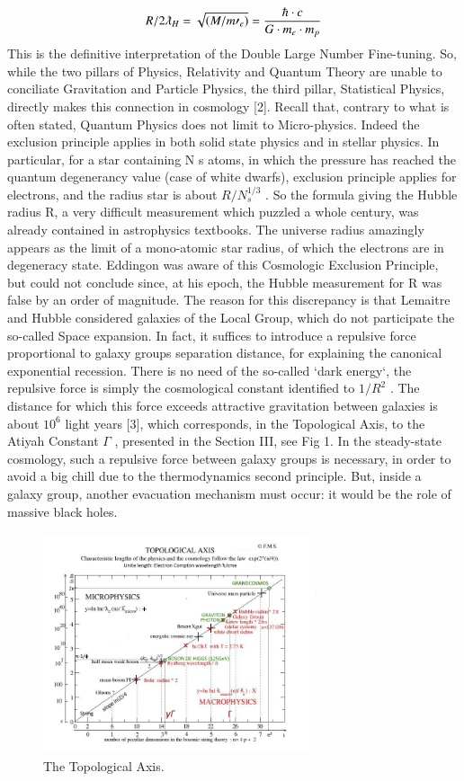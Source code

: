 \documentclass[twoside,draft]{article}
\begin{document}
{$$R/2\lambdabar_{H} = \sqrt{(M/m\prime_{e})} = \frac{\hbar \cdot c}{G \cdot m_{e}\cdot m_{p}}$$
This is the definitive interpretation of the Double Large Number Fine-tuning. So, while the two
pillars of Physics, Relativity and Quantum Theory are unable to conciliate Gravitation and Particle
Physics, the third pillar, Statistical Physics, directly makes this connection in cosmology [2].
Recall that, contrary to what is often stated, Quantum Physics does not limit to Micro-physics.
Indeed the exclusion principle applies in both solid state physics and in stellar physics. In particular,
for a star containing N s atoms, in which the pressure has reached the quantum degenerancy value
(case of white dwarfs), exclusion principle applies for electrons, and the radius star is about $R/N_{s}^{1/3}$ .
So the formula giving the Hubble radius R, a very difficult measurement which puzzled a whole
century, was already contained in astrophysics textbooks. The universe radius amazingly appears as
the limit of a mono-atomic star radius, of which the electrons are in degeneracy state. Eddingon was
aware of this Cosmologic Exclusion Principle, but could not conclude since, at his epoch, the
Hubble measurement for R was false by an order of magnitude.
The reason for this discrepancy is that Lemaitre and Hubble considered galaxies of the Local
Group, which do not participate the so-called Space expansion. In fact, it suffices to introduce a
repulsive force proportional to galaxy groups separation distance, for explaining the canonical
exponential recession. There is no need of the so-called `dark energy`, the repulsive force is simply
the cosmological constant identified to $1/R^{2}$ . The distance for which this force exceeds attractive
gravitation between galaxies is about $10^{6}$ light years \cite{fm1}[3], which corresponds, in the Topological
Axis, to the Atiyah Constant $\Gamma$ , presented in the Section III, see Fig 1.
In the steady-state cosmology, such a repulsive force between galaxy groups is necessary, in
order to avoid a big chill due to the thermodynamics second principle. But, inside a galaxy group,
another evacuation mechanism must occur: it would be the role of massive black holes.

\begin{figure}
\centering
\includegraphics[width=8cm,height=6.5cm]{./figures/figure}
\caption{The Topological Axis.}
\label{fig:figure_label}
\end{figure}

}
\end{document}
